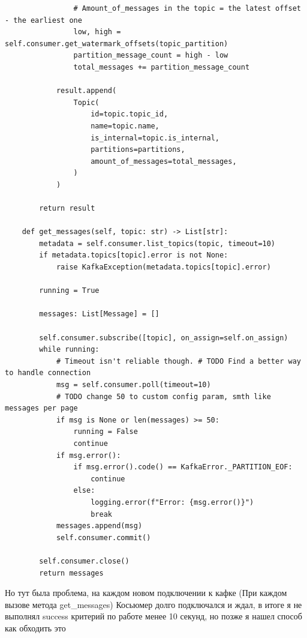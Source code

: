 \documentclass[10pt , a4paper]{report}
\newenvironment{code}{\captionsetup{type=listing}}{}
\begin{document}
\begin{code}
\begin{verbatim}
                # Amount_of_messages in the topic = the latest offset - the earliest one
                low, high = self.consumer.get_watermark_offsets(topic_partition)
                partition_message_count = high - low
                total_messages += partition_message_count

            result.append(
                Topic(
                    id=topic.topic_id,
                    name=topic.name,
                    is_internal=topic.is_internal,
                    partitions=partitions,
                    amount_of_messages=total_messages,
                )
            )

        return result

    def get_messages(self, topic: str) -> List[str]:
        metadata = self.consumer.list_topics(topic, timeout=10)
        if metadata.topics[topic].error is not None:
            raise KafkaException(metadata.topics[topic].error)

        running = True

        messages: List[Message] = []

        self.consumer.subscribe([topic], on_assign=self.on_assign)
        while running:
            # Timeout isn't reliable though. # TODO Find a better way to handle connection
            msg = self.consumer.poll(timeout=10)
            # TODO change 50 to custom config param, smth like messages per page
            if msg is None or len(messages) >= 50:
                running = False
                continue
            if msg.error():
                if msg.error().code() == KafkaError._PARTITION_EOF:
                    continue
                else:
                    logging.error(f"Error: {msg.error()}")
                    break
            messages.append(msg)
            self.consumer.commit()

        self.consumer.close()
        return messages
  \end{verbatim}
\end{code}

Но тут была проблема, на каждом новом подключении к кафке (При каждом вызове метода get\_messages) Косьюмер долго подключался и ждал, в итоге я не выполнял success критерий по работе менее 10 секунд, но позже я нашел способ как обходить это
\end{document}
